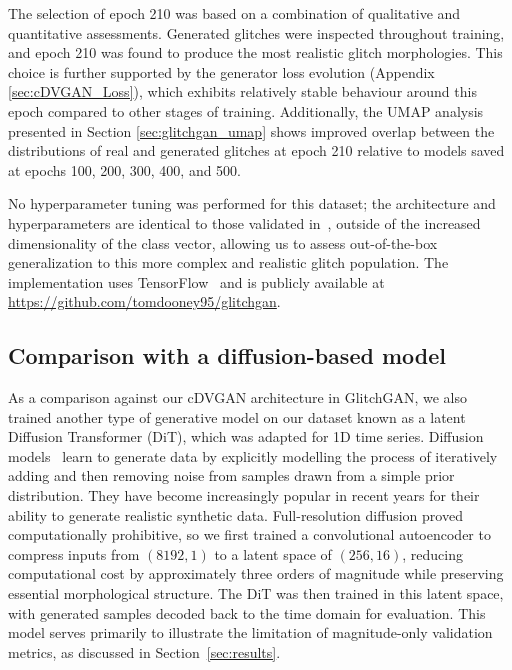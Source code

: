 \documentclass[reprint,nofootinbib,amsmath,amssymb,aps,floatfix]{revtex4-2}
\begin{document}

The selection of epoch 210 was based on a combination of qualitative and quantitative assessments. Generated glitches were inspected throughout training, and epoch 210 was found to produce the most realistic glitch morphologies. This choice is further supported by the generator loss evolution (Appendix \ref{sec:cDVGAN_Loss}), which exhibits relatively stable behaviour around this epoch compared to other stages of training. Additionally, the UMAP analysis presented in Section \ref{sec:glitchgan_umap} shows improved overlap between the distributions of real and generated glitches at epoch 210 relative to models saved at epochs 100, 200, 300, 400, and 500.
 
No hyperparameter tuning was performed for this dataset; the architecture and hyperparameters are identical to those validated in~\cite{cdvgan}, outside of the increased dimensionality of the class vector, allowing us to assess out-of-the-box generalization to this more complex and realistic glitch population.
The implementation uses TensorFlow~\cite{tensorflow2015-whitepaper} and is publicly available at \url{https://github.com/tomdooney95/glitchgan}.

\subsection{Comparison with a diffusion-based model}

As a comparison against our cDVGAN architecture in GlitchGAN, we also trained another type of generative model on our dataset known as a latent Diffusion Transformer (DiT), which was adapted for 1D time series.
Diffusion models~\cite{Ho2020DDPM, diffusionOriginal, ho2022classifierfree} learn to generate data by explicitly modelling the process of iteratively adding and then removing noise from samples drawn from a simple prior distribution.
They have become increasingly popular in recent years for their ability to generate realistic synthetic data.
Full-resolution diffusion proved computationally prohibitive, so we first trained a convolutional autoencoder to compress inputs from $(8192,1)$ to a latent space of $(256,16)$, reducing computational cost by approximately three orders of magnitude while preserving essential morphological structure.
The DiT was then trained in this latent space, with generated samples decoded back to the time domain for evaluation.
This model serves primarily to illustrate the limitation of magnitude-only validation metrics, as discussed in Section~\ref{sec:results}.
\end{document}
